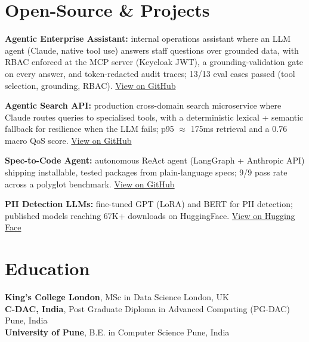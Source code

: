 \documentclass[10pt,a4paper]{article}
\begin{document}
\section{Open-Source \& Projects}
\begin{tight}
  \item \textbf{Agentic Enterprise Assistant:} internal operations assistant where an LLM agent (Claude, native tool use) answers staff questions over grounded data, with RBAC enforced at the MCP server (Keycloak JWT), a grounding-validation gate on every answer, and token-redacted audit traces; 13/13 eval cases passed (tool selection, grounding, RBAC). \href{https://github.com/abhijeetscode/Agentic-Enterprise-Assistant}{View on GitHub}
  \item \textbf{Agentic Search API:} production cross-domain search microservice where Claude routes queries to specialised tools, with a deterministic lexical + semantic fallback for resilience when the LLM fails; p95 $\approx$ 175ms retrieval and a 0.76 macro QoS score. \href{https://github.com/abhijeetscode/search-agent}{View on GitHub}
  \item \textbf{Spec-to-Code Agent:} autonomous ReAct agent (LangGraph + Anthropic API) shipping installable, tested packages from plain-language specs; 9/9 pass rate across a polyglot benchmark. \href{https://github.com/abhijeetscode/Spec-to-Code-Agent}{View on GitHub}
  \item \textbf{PII Detection LLMs:} fine-tuned GPT (LoRA) and BERT for PII detection; published models reaching 67K+ downloads on HuggingFace. \href{https://huggingface.co/ab-ai/pii_model}{View on Hugging Face}
\end{tight}

\section{Education}
{\color{company}\bfseries King's College London}, MSc in Data Science \hfill {\color{muted}London, UK}\\
{\color{company}\bfseries C-DAC, India}, Post Graduate Diploma in Advanced Computing (PG-DAC) \hfill {\color{muted}Pune, India}\\
{\color{company}\bfseries University of Pune}, B.E. in Computer Science \hfill {\color{muted}Pune, India}
\end{document}
